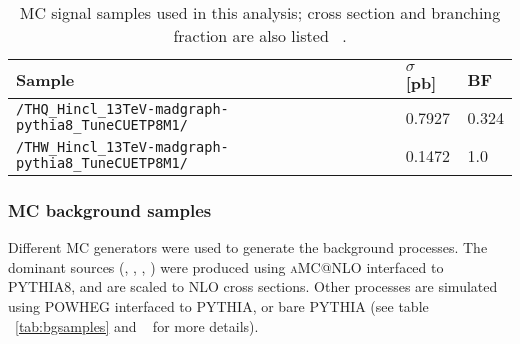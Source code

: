 \begin{table}[h]
\centering \small
\begin{tabular}{lll}
Sample & $\sigma$ [pb] & BF \\ \hline
\verb|/THQ_Hincl_13TeV-madgraph-pythia8_TuneCUETP8M1/|                  & 0.7927 & 0.324 \\
\verb|/THW_Hincl_13TeV-madgraph-pythia8_TuneCUETP8M1/|                  & 0.1472 & 1.0   \\\hline
































                                                                        
\end{tabular}
\caption[MC signal samples.]{MC signal samples used in this analysis; cross section and branching fraction are also listed ~\cite{THQProdTwiki}.}\label{tab:sigsamples}
\end{table}

\subsubsection*{MC background samples}

Different MC generators were used to generate the background processes. The dominant sources (\ttbar, \ttW, \ttZ, \ttH) were produced using \textsc{aMC@NLO} interfaced to PYTHIA8, and are scaled to NLO cross sections. Other processes are simulated using POWHEG interfaced to PYTHIA, or bare PYTHIA (see table ~\ref{tab:bgsamples} and ~\cite{CMS_AN_2016-211} for more details).

